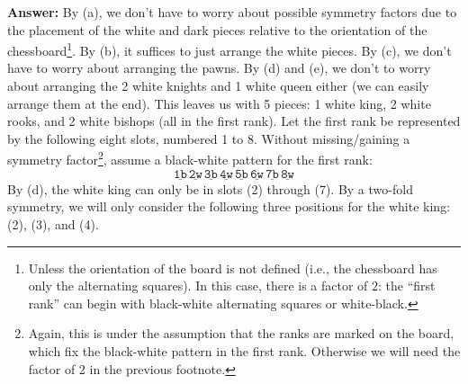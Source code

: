 \documentclass[11pt]{article}
\begin{document}
\noindent \textbf{Answer:} By (a), we don't have to worry about possible symmetry factors due to the placement of the white and dark pieces relative to the orientation of the chessboard\footnote{Unless the orientation of the board is not defined (i.e., the chessboard has only the alternating squares). In this case, there is a factor of $2$: the ``first rank'' can begin with black-white alternating squares or white-black.}. By (b), it suffices to just arrange the white pieces. By (c), we don't have to worry about arranging the pawns. By (d) and (e), we don't to worry about arranging the 2 white knights and 1 white queen either (we can easily arrange them at the end). This leaves us with 5 pieces: 1 white king, 2 white rooks, and 2 white bishops (all in the first rank). Let the first rank be represented by the following eight slots, numbered 1 to 8. Without missing/gaining a symmetry factor\footnote{Again, this is under the assumption that the ranks are marked on the board, which fix the black-white pattern in the first rank. Otherwise we will need the factor of 2 in the previous footnote.}, assume a black-white pattern for the first rank: 
\begin{equation*}
\underline{\texttt{1b}}\,
\underline{\texttt{2w}}\,
\underline{\texttt{3b}}\,
\underline{\texttt{4w}}\,
\underline{\texttt{5b}}\,
\underline{\texttt{6w}}\,
\underline{\texttt{7b}}\,
\underline{\texttt{8w}}
\end{equation*}
By (d), the white king can only be in slots (2) through (7). By a two-fold symmetry, we will only consider the following three positions for the white king: (2), (3), and (4). 
\end{document}
